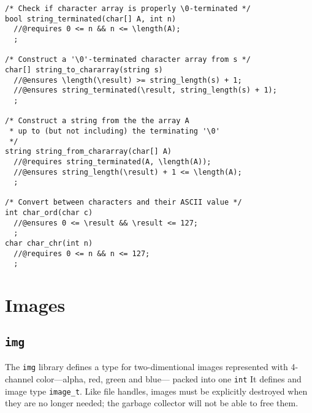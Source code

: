\documentclass[11pt]{article}
\begin{document}
\begin{small}
\begin{verbatim}
/* Check if character array is properly \0-terminated */
bool string_terminated(char[] A, int n)
  //@requires 0 <= n && n <= \length(A);
  ;

/* Construct a '\0'-terminated character array from s */
char[] string_to_chararray(string s)
  //@ensures \length(\result) >= string_length(s) + 1;
  //@ensures string_terminated(\result, string_length(s) + 1);
  ;

/* Construct a string from the the array A
 * up to (but not including) the terminating '\0'
 */
string string_from_chararray(char[] A)
  //@requires string_terminated(A, \length(A));
  //@ensures string_length(\result) + 1 <= \length(A);
  ;

/* Convert between characters and their ASCII value */
int char_ord(char c)
  //@ensures 0 <= \result && \result <= 127;
  ;
char char_chr(int n)
  //@requires 0 <= n && n <= 127;
  ;
\end{verbatim}
\end{small}

\section{Images}

\subsection{\tt img}

The \verb'img' library defines a type for two-dimentional images
represented with 4-channel color---alpha, red, green and blue---
packed into one \verb'int'  It defines and image type \verb'image_t'.
Like file handles, images must be explicitly destroyed when they
are no longer needed; the garbage collector will not be able to
free them.
\end{document}
